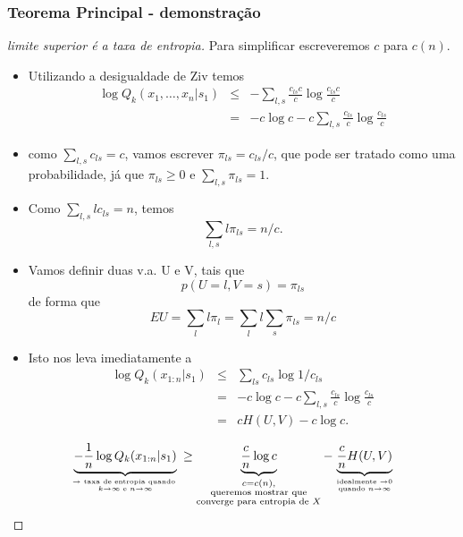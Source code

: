 \begin{frame}[allowframebreaks]
  \frametitle{Teorema Principal - demonstração}
  \begin{proof}[limite superior é a taxa de entropia]
  Para simplificar escreveremos $c$ para $c(n)$. 
  \begin{itemize}
  \item Utilizando a desigualdade de Ziv temos
	\begin{eqnarray}
	\log Q_k (x_1,\ldots,x_n | s_1) &\leq& - \sum_{l,s} \frac{c_{ls} c}{c} \log \frac{c_{ls} c}{c} \nonumber \\
		&=& -c\log c - c \sum_{l,s} \frac{c_{ls}}{c} \log \frac{c_{ls}}{c} 
	\end{eqnarray}
  \item como $\sum_{l,s} c_{ls} = c$, vamos escrever $\pi_{ls} = c_{ls}/c$, que pode ser tratado como uma probabilidade,
	já que $\pi_{ls} \geq 0$ e $\sum_{l,s} \pi_{ls} = 1$.
  \end{itemize}
  \proofbreak
  \begin{itemize}
  \item Como $\sum_{l,s} l c_{ls} = n$, temos
	\begin{equation}
	\sum_{l,s} l \pi_{ls} = n/c .
	\end{equation}
  \item Vamos definir duas v.a. U e V, tais que
	\begin{equation}
	p(U=l, V=s) = \pi_{ls}
	\end{equation} 
 	de forma que
	\begin{equation}
	EU = \sum_l l \pi_l = \sum_l l \sum_s \pi_{ls} = n/c 
	\end{equation}
  \end{itemize}
  \proofbreak
  \begin{itemize}
  \item Isto nos leva imediatamente a
	\begin{eqnarray}
	\log Q_k (x_{1:n} | s_1) &\leq& \sum_{ls} c_{ls} \log 1/c_{ls} \nonumber \\
		&=& -c\log c - c \sum_{l,s} \frac{c_{ls}}{c} \log \frac{c_{ls}}{c} \nonumber \\
		&=& c H(U,V) - c\log c .
	\end{eqnarray}
  \end{itemize}
  \proofbreak

  \begin{equation}
  \underbrace{- \frac{1}{n} \log Q_k (x_{1:n} | s_1) }_{\rightarrow \text{ taxa de entropia quando } \atop k \rightarrow \infty \text{ e } n \rightarrow \infty } 
	\geq \underbrace{ \frac{c}{n} \log c }_{\begin{subarray}{c} c=c(n), \\ \text{ queremos mostrar que } \\ \text{converge para entropia de $X$} \end{subarray}} 
	- \underbrace{ \frac{c}{n} H(U,V) }_{\text{idealmente } \rightarrow 0 \atop \text{quando } n \rightarrow \infty} 
  \end{equation}


\end{proof}
\end{frame}
